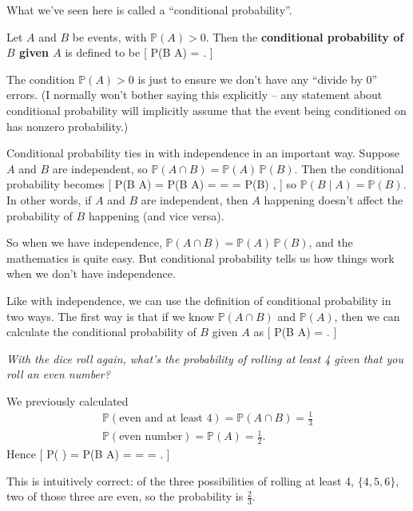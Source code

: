 \documentclass[
  letterpaper,
]{report}
\theoremstyle{definition}
\theoremstyle{definition}
\theoremstyle{remark}
\begin{document}
What we've seen here is called a ``conditional probability''.

Let \(A\) and \(B\) be events, with \(\mathbb P(A) > 0\). Then the
\textbf{conditional probability of \(B\) given \(A\)} is defined to be
{[} \mathbb P(B \mid A) =  . {]}

The condition \(\mathbb P(A) > 0\) is just to ensure we don't have any
``divide by 0'' errors. (I normally won't bother saying this explicitly
-- any statement about conditional probability will implicitly assume
that the event being conditioned on has nonzero probability.)

Conditional probability ties in with independence in an important way.
Suppose \(A\) and \(B\) are independent, so
\(\mathbb P(A \cap B) = \mathbb P(A) \, \mathbb P(B)\). Then the
conditional probability becomes {[} \mathbb P(B \mid A) = \mathbb P(B
\mid A) =  =
 = \mathbb P(B) , {]}
so \(\mathbb P(B \mid A) = \mathbb P(B)\). In other words, if \(A\) and
\(B\) are independent, then \(A\) happening doesn't affect the
probability of \(B\) happening (and vice versa).

So when we have independence,
\(\mathbb P(A \cap B) = \mathbb P(A)\,\mathbb P(B)\), and the
mathematics is quite easy. But conditional probability tells us how
things work when we don't have independence.

Like with independence, we can use the definition of conditional
probability in two ways. The first way is that if we know
\(\mathbb P(A \cap B)\) and \(\mathbb P(A)\), then we can calculate the
conditional probability of \(B\) given \(A\) as {[} \mathbb P(B \mid A)
=  . {]}

\emph{With the dice roll again, what's the probability of rolling at
least 4 given that you roll an even number?}

We previously calculated \begin{gather*}
\mathbb P(\text{even and at least 4}) = \mathbb P(A \cap B) = \tfrac{1}{3} \\
\mathbb P(\text{even number}) = \mathbb P(A) = \tfrac{1}{2} .
\end{gather*} Hence {[} \mathbb P( \mid {}) =
\mathbb P(B \mid A) =  =
 =  . {]}

This is intuitively correct: of the three possibilities of rolling at
least 4, \(\{4,5,6\}\), two of those three are even, so the probability
is \(\frac23\).
\end{document}
